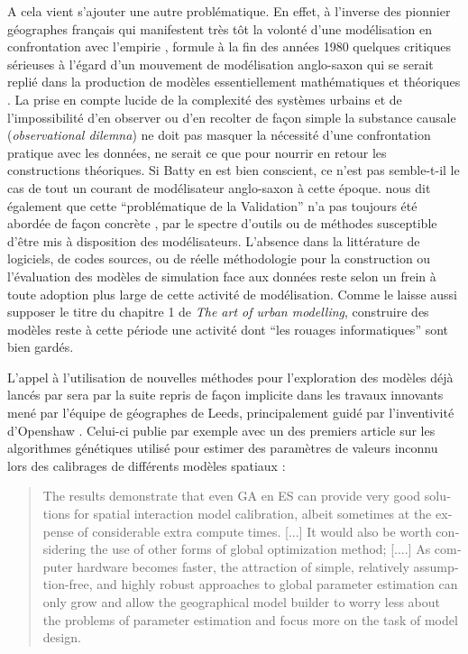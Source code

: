 A cela vient s'ajouter une autre problématique. En effet, à l'inverse des pionnier géographes français qui manifestent très tôt la volonté d'une modélisation en confrontation avec l'empirie \autocites{Pumain1983,AMORAL1983}, \textcite{Openshaw1989} formule à la fin des années 1980 quelques critiques sérieuses à l'égard d'un mouvement de modélisation anglo-saxon qui se serait replié dans la production de modèles essentiellement mathématiques et théoriques . La prise en compte lucide de la complexité des systèmes urbains et de l'impossibilité d'en observer ou d'en recolter de façon simple la substance causale (\textit{observational dilemna}) ne doit pas masquer la nécessité d'une confrontation pratique avec les données, ne serait ce que pour nourrir en retour les constructions théoriques. Si Batty en est bien conscient, ce n'est pas semble-t-il le cas de tout un courant de modélisateur anglo-saxon à cette époque. \textcite{Openshaw1989} nous dit également que cette \enquote{problématique de la Validation} n'a pas toujours été abordée de façon concrète , par le spectre d'outils ou de méthodes susceptible d'être mis à disposition des modélisateurs. L'absence dans la littérature de logiciels, de codes sources, ou de réelle méthodologie pour la construction ou l'évaluation des modèles de simulation face aux données reste selon \textcite{Openshaw1989} un frein à toute adoption plus large de cette activité de modélisation. Comme le laisse aussi supposer le titre du chapitre 1 de \textcite{Batty1976} \textit{The art of urban modelling}, construire des modèles reste à cette période une activité dont \enquote{les rouages informatiques} sont bien gardés. %

L'appel à l'utilisation de nouvelles méthodes pour l'exploration des modèles déjà lancés par \textcite{Batty1976} sera par la suite repris de façon implicite dans les travaux innovants mené par l'équipe de géographes de Leeds, principalement guidé par l'inventivité d'Openshaw \autocites{Openshaw1983, Openshaw1988, Diplock1996, Turton1998}. Celui-ci publie par exemple avec \textcite{Diplock1996} un des premiers article sur les algorithmes génétiques utilisé pour estimer des paramètres de valeurs inconnu lors des calibrages de différents modèles spatiaux :

\foreignblockquote{english}[\cite{Diplock1996}]{The results demonstrate that even GA en ES can provide very good solutions for spatial interaction model calibration, albeit sometimes at the expense of considerable extra compute times. [...] It would also be worth considering the use of other forms of global optimization method; [....] As computer hardware becomes faster, the attraction of simple, relatively assumption-free, and highly robust approaches to global parameter estimation can only grow and allow the geographical model builder to worry less about the problems of parameter estimation and focus more on the task of model design.}

